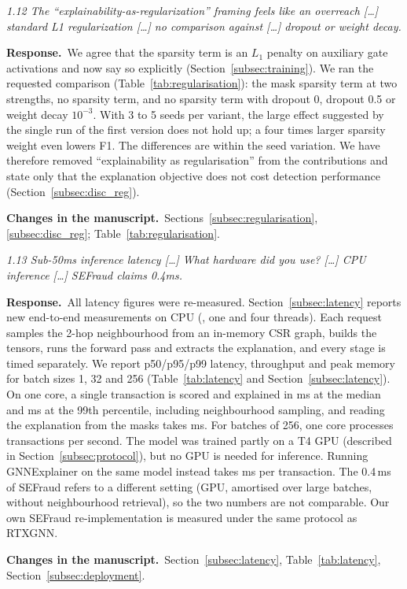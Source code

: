 \documentclass[11pt]{article}
\newenvironment{comment}{\par\medskip\noindent\begin{minipage}{\linewidth}\itshape\color{black!75}}{\end{minipage}\par\smallskip}
\newcommand{\resp}{\par\noindent\textbf{Response.}\ }
\newcommand{\change}{\par\noindent\textbf{Changes in the manuscript.}\ }
\begin{document}
\begin{comment}
1.12 The ``explainability-as-regularization'' framing feels like an overreach [\dots] standard L1 regularization [\dots] no comparison against [\dots] dropout or weight decay.
\end{comment}
\resp We agree that the sparsity term is an $L_1$ penalty on auxiliary gate activations and now say so explicitly (Section~\ref{subsec:training}). We ran the requested comparison (Table~\ref{tab:regularisation}): the mask sparsity term at two strengths, no sparsity term, and no sparsity term with dropout 0, dropout 0.5 or weight decay $10^{-3}$. With 3 to 5 seeds per variant, the large effect suggested by the single run of the first version does not hold up; a four times larger sparsity weight even lowers F1. The differences are within the seed variation. We have therefore removed ``explainability as regularisation'' from the contributions and state only that the explanation objective does not cost detection performance (Section~\ref{subsec:disc_reg}).
\change Sections~\ref{subsec:regularisation}, \ref{subsec:disc_reg}; Table~\ref{tab:regularisation}.

\begin{comment}
1.13 Sub-50ms inference latency [\dots] What hardware did you use? [\dots] CPU inference [\dots] SEFraud claims 0.4ms.
\end{comment}
\resp All latency figures were re-measured. Section~\ref{subsec:latency} reports new end-to-end measurements on CPU (\cpuName, one and four threads). Each request samples the 2-hop neighbourhood from an in-memory CSR graph, builds the tensors, runs the forward pass and extracts the explanation, and every stage is timed separately. We report p50/p95/p99 latency, throughput and peak memory for batch sizes 1, 32 and 256 (Table~\ref{tab:latency} and Section~\ref{subsec:latency}). On one core, a single transaction is scored and explained in \rtxLatBoneMed{} ms at the median and \rtxLatBoneP{} ms at the 99th percentile, including neighbourhood sampling, and reading the explanation from the masks takes \rtxLatBoneExp{} ms. For batches of 256, one core processes \rtxLatBtwofiftysixTps{} transactions per second. The model was trained partly on a T4 GPU (described in Section~\ref{subsec:protocol}), but no GPU is needed for inference. Running GNNExplainer on the same model instead takes \rtxgnnexLatBoneMed{} ms per transaction. The 0.4\,ms of SEFraud refers to a different setting (GPU, amortised over large batches, without neighbourhood retrieval), so the two numbers are not comparable. Our own SEFraud re-implementation is measured under the same protocol as RTXGNN.
\change Section~\ref{subsec:latency}, Table~\ref{tab:latency}, Section~\ref{subsec:deployment}.
\end{document}
